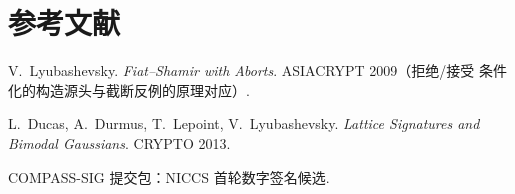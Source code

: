 \documentclass[UTF8,11pt,a4paper]{ctexart}
\begin{document}
\section*{参考文献}
\begin{enumerate}[label={[\arabic*]}]
\item V.~Lyubashevsky. \emph{Fiat--Shamir with Aborts}. ASIACRYPT 2009（拒绝/接受
  条件化的构造源头与截断反例的原理对应）.
\item L.~Ducas, A.~Durmus, T.~Lepoint, V.~Lyubashevsky. \emph{Lattice Signatures and
  Bimodal Gaussians}. CRYPTO 2013.
\item COMPASS-SIG 提交包：NICCS 首轮数字签名候选.
\end{enumerate}
\end{document}
